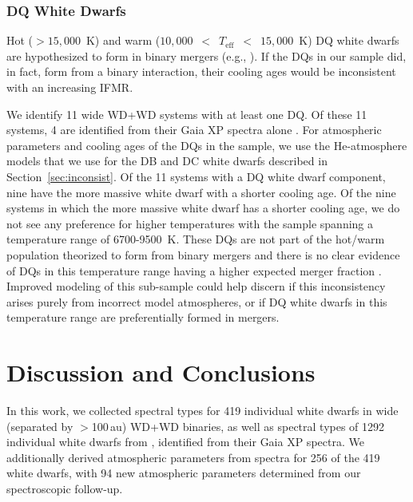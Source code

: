 \documentclass[twocolumn]{aastex631}
\begin{document}
\subsubsection{DQ White Dwarfs}
Hot ($>$$15{,}000$~K) and warm ($10{,}000$~$<$~$T_{\mathrm{eff}}$~$<$~$15{,}000$~K) DQ white dwarfs are hypothesized to form in binary mergers (e.g., \citealt{2015ASPC..493..547D,2016ApJ...817...27W,2020MNRAS.491L..40K}). If the DQs in our sample did, in fact, form from a binary interaction, their cooling ages would be inconsistent with an increasing IFMR.

We identify 11 wide WD+WD systems with at least one DQ. Of these 11 systems, 4 are identified from their Gaia XP spectra alone \citep{2024A&A...682A...5V}. For atmospheric parameters and cooling ages of the DQs in the sample, we use the He-atmosphere models that we use for the DB and DC white dwarfs described in Section~\ref{sec:inconsist}. Of the 11 systems with a DQ white dwarf component, nine have the more massive white dwarf with a shorter cooling age. Of the nine systems in which the more massive white dwarf has a shorter cooling age, we do not see any preference for higher temperatures with the sample spanning a temperature range of 6700-9500~K. These DQs are not part of the hot/warm population theorized to form from binary mergers and there is no clear evidence of DQs in this temperature range having a higher expected merger fraction \citep[e.g., ][]{2019ApJ...885...74C, 2019A&A...628A.102K}. Improved modeling of this sub-sample could help discern if this inconsistency arises purely from incorrect model atmospheres, or if DQ white dwarfs in this temperature range are preferentially formed in mergers.

\section{Discussion and Conclusions}\label{sec:conclusions}
In this work, we collected spectral types for 419 individual white dwarfs in wide (separated by $>$100\,au) WD+WD binaries, as well as spectral types of 1292 individual white dwarfs from \cite{2024A&A...682A...5V}, identified from their Gaia XP spectra. We additionally derived atmospheric parameters from spectra for 256 of the 419 white dwarfs, with 94 new atmospheric parameters determined from our spectroscopic follow-up.
\end{document}
